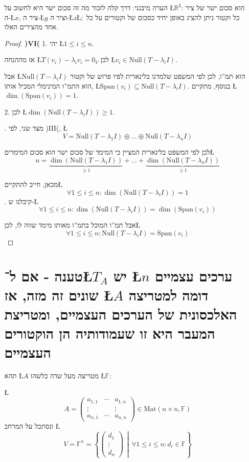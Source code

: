 \documentclass[english,hebrew]{article}
\begin{document}
הערה מיבגני: דרך קלה לזכור מה זה סכום ישר היא לחשוב על \L{$\mathbb{R}^{3}$}:
הוא סכום ישר של ציר ה-\L{$x$}, ציר ה-\L{$y$} וציר ה-\L{$z$}\L{$;$}
כל וקטור ניתן להציג באופן יחיד כסכום של וקטורים על כל אחד מהצירים
האלו.
\begin{proof}
\textbf{)VI(} 1. יהי \L{$1\le i\le n$}. 

אז מההנחה \L{$T(v_{i})-\lambda_{i}v_{i}=0_{V}$} לכן \L{$v_{i}\in\text{Null}(T-\lambda_{i}I)$}.

אבל \L{$\text{Null}(T-\lambda_{i}I)$} הוא תמ\textquotedblright ו,
לכן לפי המשפט שלמדנו בלינארית {\endL} לפיו פרוש של וקטור
הוא התמ\textquotedblright ו המינימלי המכיל אותו, \L{$\text{Span}(v_{i})\subseteq\text{Null}(T-\lambda_{i}I)$}.
בנוסף, מתקיים \L{$\dim\left(\text{Span}(v_{i})\right)=1$}.

2. לכן \L{$\dim\left(\text{Null}(T-\lambda_{i}I)\right)\ge1$}.

{\endL}. מצד שני, לפי )III(, \L{%
\[
V=\text{Null}(T-\lambda_{1}I)\oplus\dots\oplus\text{Null}(T-\lambda_{n}I)
\]
}%

לכן לפי המשפט בלינארית {\endL} המציין כי המימד של סכום ישר
הוא סכום המימדים\L{%
\[
n=\underset{\geq1}{\underbrace{\dim(\text{Null}(T-\lambda_{1}I))}}+\dots+\underset{\geq1}{\underbrace{\dim(\text{Null}(T-\lambda_{n}I))}}
\]
}%

מכאן, חייב להתקיים\L{%
\[
\forall1\le i\le n:\dim\left(\text{Null}(T-\lambda_{i}I)\right)=1
\]
}%
 {\endL}. קיבלנו ש-\L{%
\[
\forall1\le i\le n:\dim\left(\text{Null}(T-\lambda_{i}I)\right)=\dim\left(\text{Span}(v_{i})\right)
\]
}%

אבל תמ\textquotedblright ו המוכל בתמ\textquotedblright ו מאותו מימד
שווה לו, לכן\L{%
\[
\forall1\le i\le n:\text{Null}(T-\lambda_{i}I)=\text{Span}(v_{i})
\]
}%
\end{proof}

\section{טענה - אם ל־\L{$T_{A}$} יש \L{$n$} ערכים עצמיים שונים זה מזה, אז
\L{$A$} דומה למטריצה האלכסונית של הערכים העצמיים, ומטריצת המעבר היא
זו שעמודותיה הן הוקטורים העצמיים}

תהא \L{$A$} מטריצה מעל שדה כלשהו \L{$\mathbb{F}$}:

\L{%
\[
A=\begin{pmatrix}a_{1,1} & \cdots & a_{1,n}\\
\vdots &  & \vdots\\
a_{n,1} & \cdots & a_{n,n}
\end{pmatrix}\in\text{Mat}(n\times n,\mathbb{F})
\]
}%
ונסתכל על המרחב \L{%
\[
V=\mathbb{F}^{n}=\left\{ \begin{pmatrix}d_{1}\\
\vdots\\
d_{n}
\end{pmatrix}\,\middle|\,\forall1\le i\le n:d_{i}\in\mathbb{F}\right\} 
\]
}%
\end{document}
